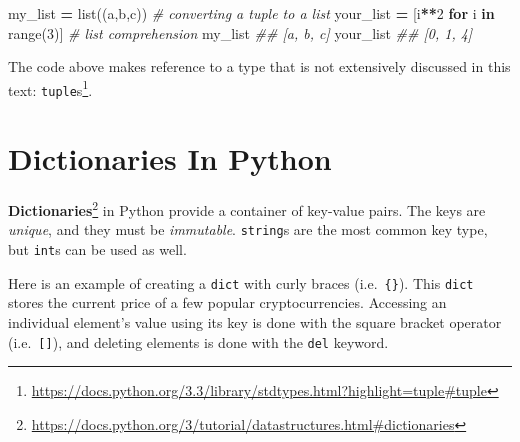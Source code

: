 \documentclass[
  12pt,
  krantz2]{krantz}
\makeatletter
\newenvironment{Shaded}{\begin{snugshade}}{\end{snugshade}}
\newcommand{\BuiltInTok}[1]{#1}
\newcommand{\CommentTok}[1]{\textcolor[rgb]{0.37,0.37,0.37}{\textit{#1}}}
\newcommand{\ControlFlowTok}[1]{\textcolor[rgb]{0.27,0.27,0.27}{\textbf{#1}}}
\newcommand{\DecValTok}[1]{\textcolor[rgb]{0.06,0.06,0.06}{#1}}
\newcommand{\KeywordTok}[1]{\textcolor[rgb]{0.27,0.27,0.27}{\textbf{#1}}}
\newcommand{\NormalTok}[1]{#1}
\newcommand{\OperatorTok}[1]{\textcolor[rgb]{0.43,0.43,0.43}{\textbf{#1}}}
\newcommand{\StringTok}[1]{\textcolor[rgb]{0.5,0.5,0.5}{#1}}
\renewcommand{\href}[2]{#2\footnote{\url{#1}}}
\newenvironment{kframe}{%
\medskip{}
\setlength{\fboxsep}{.8em}
 \def\at@end@of@kframe{}%
 \ifinner\ifhmode%
  \def\at@end@of@kframe{\end{minipage}}%
  \begin{minipage}{\columnwidth}%
 \fi\fi%
 \def\FrameCommand##1{\hskip\@totalleftmargin \hskip-\fboxsep
 \colorbox{shadecolor}{##1}\hskip-\fboxsep
     \hskip-\linewidth \hskip-\@totalleftmargin \hskip\columnwidth}%
 \MakeFramed {\advance\hsize-\width
   \@totalleftmargin\z@ \linewidth\hsize
   \@setminipage}}%
 {\par\unskip\endMakeFramed%
 \at@end@of@kframe}
\renewenvironment{Shaded}{\begin{kframe}}{\end{kframe}}
\makeatother
\begin{document}
\begin{Shaded}
\begin{Highlighting}[]
\NormalTok{my\_list }\OperatorTok{=} \BuiltInTok{list}\NormalTok{((}\StringTok{\textquotesingle{}a\textquotesingle{}}\NormalTok{,}\StringTok{\textquotesingle{}b\textquotesingle{}}\NormalTok{,}\StringTok{\textquotesingle{}c\textquotesingle{}}\NormalTok{)) }\CommentTok{\# converting a tuple to a list}
\NormalTok{your\_list }\OperatorTok{=}\NormalTok{ [i}\OperatorTok{**}\DecValTok{2} \ControlFlowTok{for}\NormalTok{ i }\KeywordTok{in} \BuiltInTok{range}\NormalTok{(}\DecValTok{3}\NormalTok{)] }\CommentTok{\# list comprehension}
\NormalTok{my\_list}
\CommentTok{\#\# [\textquotesingle{}a\textquotesingle{}, \textquotesingle{}b\textquotesingle{}, \textquotesingle{}c\textquotesingle{}]}
\NormalTok{your\_list}
\CommentTok{\#\# [0, 1, 4]}
\end{Highlighting}
\end{Shaded}

The code above makes reference to a type that is not extensively discussed in this text: \href{https://docs.python.org/3.3/library/stdtypes.html?highlight=tuple\#tuple}{\texttt{tuple}s}.

\hypertarget{dictionaries-in-python}{%
\section{Dictionaries In Python}\label{dictionaries-in-python}}

\href{https://docs.python.org/3/tutorial/datastructures.html\#dictionaries}{\textbf{Dictionaries}} in Python provide a container of key-value pairs. The keys are \emph{unique}, and they must be \emph{immutable}. \texttt{string}s are the most common key type, but \texttt{int}s can be used as well.

Here is an example of creating a \texttt{dict} with curly braces (i.e.~\texttt{\{\}}). This \texttt{dict} stores the current price of a few popular cryptocurrencies. Accessing an individual element's value using its key is done with the square bracket operator (i.e.~\texttt{{[}{]}}), and deleting elements is done with the \texttt{del} keyword.
\end{document}
